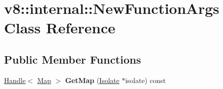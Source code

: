 \hypertarget{classv8_1_1internal_1_1NewFunctionArgs}{}\section{v8\+:\+:internal\+:\+:New\+Function\+Args Class Reference}
\label{classv8_1_1internal_1_1NewFunctionArgs}
\subsection*{Public Member Functions}
\begin{DoxyCompactItemize}
\item 
\mbox{\label{classv8_1_1internal_1_1NewFunctionArgs_a4bd9ca5a8aa91b53818779be9ca5af02}} 
\mbox{\hyperlink{classv8_1_1internal_1_1Handle}{Handle}}$<$ \mbox{\hyperlink{classv8_1_1internal_1_1Map}{Map}} $>$ {\bfseries Get\+Map} (\mbox{\hyperlink{classv8_1_1internal_1_1Isolate}{Isolate}} $\ast$isolate) const
\end{DoxyCompactItemize}
